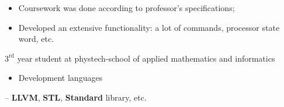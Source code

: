 \documentclass[10pt,a4paper,ragged2e,withhyper]{custom-altacv}
\begin{document}
\begin{paracol}{2}
\divider


\begin{itemize}
	\item Coursework was done according to professor's specifications;
	\item Developed an extensive functionality: a lot of commands, processor state word, etc.
\end{itemize}


\iffalse
\cvsection{Certificates and diplomas}

\cvachievement{\faGraduationCap}{Participations in two international olympiads on astronomy}{IOAA and IAO}

\cvachievement{\faMedal}{Successful course completion \cvtag{C++}}{Coursera -- <<Development basics in C++: Yellow belt>>}

\cvachievement{\faMedal}{Successful course completion \cvtag{Agile}}{Coursera -- <<Agile with Atlassian Jira>>}

\cvachievement{\faMedal}{Successful course completion \cvtag{Java}}{JetBrains Academy -- <<Java for beginners>>}
\fi



\switchcolumn


$3^\text{rd}$ year student at phystech-school of applied mathematics and informatics

\iffalse
\divider

\cvevent{\faSchool \hspace{.1ex} Secondary Eduation}{LORD lyceum}{September 2009 -- June 2020}{}
Graduated with honors
\fi




\begin{itemize}
	\item \textcolor{emphasis}{Development languages} 
\end{itemize}

 -- \textbf{LLVM}, \textbf{STL}, \textbf{Standard} library, etc.
\vspace{1ex}


\end{paracol}
\end{document}
